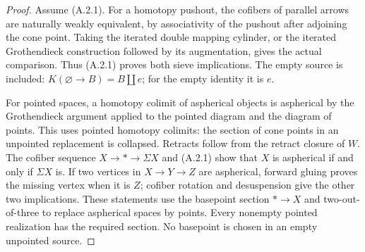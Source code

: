 \begin{proof}
Assume (A.2.1). For a homotopy pushout, the cofibers of parallel arrows are naturally weakly equivalent, by associativity of the pushout after adjoining the cone point. Taking the iterated double mapping cylinder, or the iterated Grothendieck construction followed by its augmentation, gives the actual comparison. Thus (A.2.1) proves both sieve implications. The empty source is included: $K(\varnothing\to B)=B\amalg e$; for the empty identity it is $e$.

For pointed spaces, a homotopy colimit of aspherical objects is aspherical by the Grothendieck argument applied to the pointed diagram and the diagram of points. This uses pointed homotopy colimits: the section of cone points in an unpointed replacement is collapsed. Retracts follow from the retract closure of $W$. The cofiber sequence $X\to *\to\Sigma X$ and (A.2.1) show that $X$ is aspherical if and only if $\Sigma X$ is. If two vertices in $X\to Y\to Z$ are aspherical, forward gluing proves the missing vertex when it is $Z$; cofiber rotation and desuspension give the other two implications. These statements use the basepoint section $*\to X$ and two-out-of-three to replace aspherical spaces by points. Every nonempty pointed realization has the required section. No basepoint is chosen in an empty unpointed source.
\end{proof}

